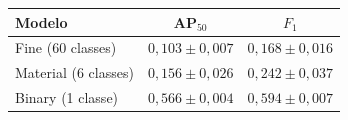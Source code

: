 \begin{tabular}{lcc}
\toprule
\textbf{Modelo} & \textbf{AP$_{50}$} & \textbf{$F_1$} \\
\midrule
Fine (60 classes) & $0{,}103\pm0{,}007$ & $0{,}168\pm0{,}016$ \\
Material (6 classes) & $0{,}156\pm0{,}026$ & $0{,}242\pm0{,}037$ \\
Binary (1 classe) & $0{,}566\pm0{,}004$ & $0{,}594\pm0{,}007$ \\
\bottomrule
\end{tabular}
